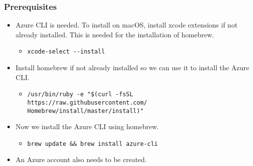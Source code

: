 \documentclass[12pt]{extarticle}
\begin{document}
\subsubsection*{Prerequisites}
\begin{itemize}
\item Azure CLI is needed. To install on macOS, install xcode extensions if not already installed. This is needed for the installation of homebrew.
	\begin{itemize}
     	\item \lstinline|xcode-select --install|
	\end{itemize}

\item Install homebrew if not already installed so we can use it to install the Azure CLI.
	\begin{itemize}
     	\item \begin{lstlisting}
/usr/bin/ruby -e "$(curl -fsSL 
https://raw.githubusercontent.com/
Homebrew/install/master/install)"
     	\end{lstlisting}
	\end{itemize}

\item Now we install the Azure CLI using homebrew.
	\begin{itemize}
     	\item \lstinline|brew update && brew install azure-cli|
	\end{itemize}
	
\item An Azure account also needs to be created.

\end{itemize}
\end{document}

